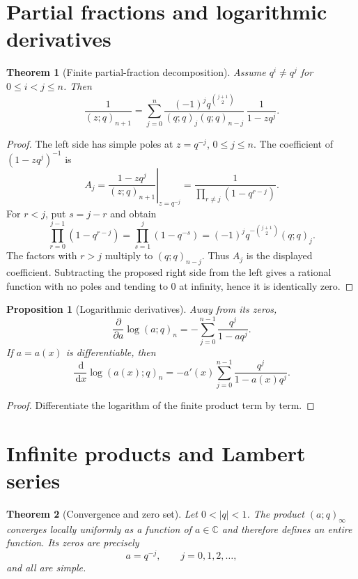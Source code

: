 \documentclass[11pt,oneside,openany]{book}
\newtheorem{theorem}{Theorem}[chapter]
\newtheorem{proposition}[proposition]{Proposition}
\theoremstyle{definition}
\theoremstyle{remark}
\newcommand{\C}{\mathbb C}
\newcommand{\dd}{\,\mathrm d}
\newcommand{\abs}[1]{\lvert #1\rvert}
\begin{document}
\section{Partial fractions and logarithmic derivatives}

\begin{theorem}[Finite partial-fraction decomposition]\label{thm:partial-fraction}
Assume $q^i\ne q^j$ for $0\le i<j\le n$.  Then
\[
 \frac{1}{(z;q)_{n+1}}
 =\sum_{j=0}^{n}
 \frac{(-1)^j q^{\binom{j+1}{2}}}
 {(q;q)_j(q;q)_{n-j}}\,
 \frac{1}{1-zq^j}.
\]
\end{theorem}

\begin{proof}
The left side has simple poles at $z=q^{-j}$, $0\le j\le n$.  The coefficient of $(1-zq^j)^{-1}$ is
\[
 A_j=\left.\frac{1-zq^j}{(z;q)_{n+1}}\right|_{z=q^{-j}}
 =\frac{1}{\prod_{r\ne j}(1-q^{r-j})}.
\]
For $r<j$, put $s=j-r$ and obtain
\[
 \prod_{r=0}^{j-1}(1-q^{r-j})
 =\prod_{s=1}^{j}(1-q^{-s})
 =(-1)^jq^{-\binom{j+1}{2}}(q;q)_j.
\]
The factors with $r>j$ multiply to $(q;q)_{n-j}$.  Thus $A_j$ is the displayed coefficient.  Subtracting the proposed right side from the left gives a rational function with no poles and tending to $0$ at infinity, hence it is identically zero.
\end{proof}

\begin{proposition}[Logarithmic derivatives]\label{prop:logder-finite}
Away from its zeros,
\[
 \frac{\partial}{\partial a}\log(a;q)_n
 =-\sum_{j=0}^{n-1}\frac{q^j}{1-aq^j}.
\]
If $a=a(x)$ is differentiable, then
\[
 \frac{\dd}{\dd x}\log(a(x);q)_n
 =-a'(x)\sum_{j=0}^{n-1}\frac{q^j}{1-a(x)q^j}.
\]
\end{proposition}

\begin{proof}
Differentiate the logarithm of the finite product term by term.
\end{proof}

\section{Infinite products and Lambert series}

\begin{theorem}[Convergence and zero set]\label{thm:poch-entire}
Let $0<\abs q<1$.  The product $(a;q)_\infty$ converges locally uniformly as a function of $a\in\C$ and therefore defines an entire function.  Its zeros are precisely
\[
 a=q^{-j},\qquad j=0,1,2,\ldots,
\]
and all are simple.
\end{theorem}
\end{document}
